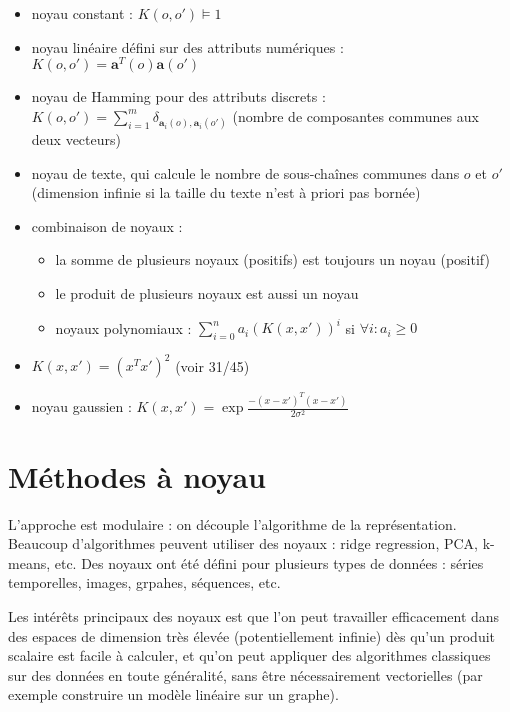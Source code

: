 \begin{itemize}
	\item noyau constant : $K(o, o') \models 1$
	\item noyau linéaire défini sur des attributs numériques : $K(o, o') = \mathbf{a}^T(o) \mathbf{a}(o')$
	\item noyau de Hamming pour des attributs discrets : $K(o, o') = \sum_{i = 1}^m \delta_{\mathbf{a}_i(o), \mathbf{a}_i(o')}$ (nombre de composantes communes aux deux vecteurs)
	\item noyau de texte, qui calcule le nombre de sous-chaînes communes dans $o$ et $o'$ (dimension infinie si la taille du texte n'est à priori pas bornée)
	\item combinaison de noyaux :
	
	\begin{itemize}
		\item la somme de plusieurs noyaux (positifs) est toujours un noyau (positif)
		\item le produit de plusieurs noyaux est aussi un noyau
		\item noyaux polynomiaux : $\sum_{i = 0}^n a_i(K(x, x'))^i$ si $\forall i : a_i \geq 0$
	\end{itemize}
	
	\item $K(x, x') = (x^Tx')^2$ (voir 31/45)
	\item noyau gaussien : $K(x, x') = \exp{\frac{-(x - x')^T(x - x')}{2 \sigma^2}}$
\end{itemize}


\section{Méthodes à noyau}


L'approche est modulaire : on découple l'algorithme de la représentation. Beaucoup d'algorithmes peuvent utiliser des noyaux : ridge regression, PCA, k-means, etc. Des noyaux ont été défini pour plusieurs types de données : séries temporelles, images, grpahes, séquences, etc.

Les intérêts principaux des noyaux est que l'on peut travailler efficacement dans des espaces de dimension très élevée (potentiellement infinie) dès qu'un produit scalaire est facile à calculer, et qu'on peut appliquer des algorithmes classiques sur des données en toute généralité, sans être nécessairement vectorielles (par exemple construire un modèle linéaire sur un graphe).

